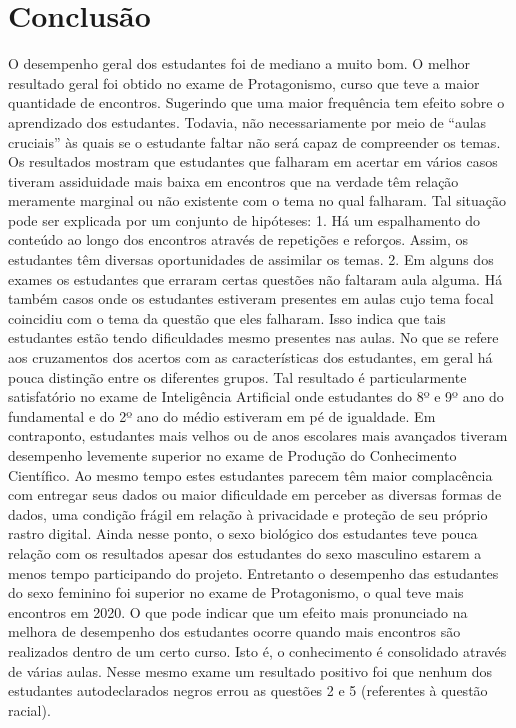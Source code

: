 \documentclass[
]{book}
\begin{document}
\hypertarget{conclusuxe3o}{%
\section{Conclusão}\label{conclusuxe3o}}

O desempenho geral dos estudantes foi de mediano a muito bom. O melhor resultado geral foi obtido no exame de Protagonismo, curso que teve a maior quantidade de encontros. Sugerindo que uma maior frequência tem efeito sobre o aprendizado dos estudantes. Todavia, não necessariamente por meio de ``aulas cruciais'' às quais se o estudante faltar não será capaz de compreender os temas.
Os resultados mostram que estudantes que falharam em acertar em vários casos tiveram assiduidade mais baixa em encontros que na verdade têm relação meramente marginal ou não existente com o tema no qual falharam. Tal situação pode ser explicada por um conjunto de hipóteses: 1. Há um espalhamento do conteúdo ao longo dos encontros através de repetições e reforços. Assim, os estudantes têm diversas oportunidades de assimilar os temas. 2. Em alguns dos exames os estudantes que erraram certas questões não faltaram aula alguma. Há também casos onde os estudantes estiveram presentes em aulas cujo tema focal coincidiu com o tema da questão que eles falharam. Isso indica que tais estudantes estão tendo dificuldades mesmo presentes nas aulas.
No que se refere aos cruzamentos dos acertos com as características dos estudantes, em geral há pouca distinção entre os diferentes grupos. Tal resultado é particularmente satisfatório no exame de Inteligência Artificial onde estudantes do 8º e 9º ano do fundamental e do 2º ano do médio estiveram em pé de igualdade. Em contraponto, estudantes mais velhos ou de anos escolares mais avançados tiveram desempenho levemente superior no exame de Produção do Conhecimento Científico. Ao mesmo tempo estes estudantes parecem têm maior complacência com entregar seus dados ou maior dificuldade em perceber as diversas formas de dados, uma condição frágil em relação à privacidade e proteção de seu próprio rastro digital.
Ainda nesse ponto, o sexo biológico dos estudantes teve pouca relação com os resultados apesar dos estudantes do sexo masculino estarem a menos tempo participando do projeto. Entretanto o desempenho das estudantes do sexo feminino foi superior no exame de Protagonismo, o qual teve mais encontros em 2020. O que pode indicar que um efeito mais pronunciado na melhora de desempenho dos estudantes ocorre quando mais encontros são realizados dentro de um certo curso. Isto é, o conhecimento é consolidado através de várias aulas. Nesse mesmo exame um resultado positivo foi que nenhum dos estudantes autodeclarados negros errou as questões 2 e 5 (referentes à questão racial).
\end{document}
